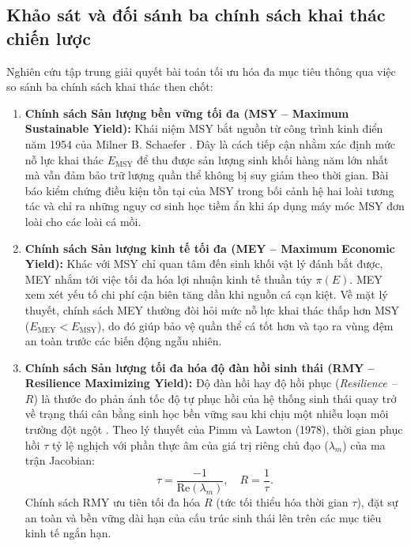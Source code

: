 \subsection{Khảo sát và đối sánh ba chính sách khai thác chiến lược}
Nghiên cứu tập trung giải quyết bài toán tối ưu hóa đa mục tiêu thông qua việc so sánh ba chính sách khai thác then chốt:
\begin{enumerate}
    \item \textbf{Chính sách Sản lượng bền vững tối đa (MSY -- Maximum Sustainable Yield):}
    Khái niệm MSY bắt nguồn từ công trình kinh điển năm 1954 của Milner B. Schaefer \cite{schaefer1954some}. Đây là cách tiếp cận nhằm xác định mức nỗ lực khai thác $E_{\mathrm{MSY}}$ để thu được sản lượng sinh khối hàng năm lớn nhất mà vẫn đảm bảo trữ lượng quần thể không bị suy giảm theo thời gian. Bài báo kiểm chứng điều kiện tồn tại của MSY trong bối cảnh hệ hai loài tương tác và chỉ ra những nguy cơ sinh học tiềm ẩn khi áp dụng máy móc MSY đơn loài cho các loài cá mồi.
    
    \item \textbf{Chính sách Sản lượng kinh tế tối đa (MEY -- Maximum Economic Yield):}
    Khác với MSY chỉ quan tâm đến sinh khối vật lý đánh bắt được, MEY nhắm tới việc tối đa hóa lợi nhuận kinh tế thuần túy $\pi(E)$. MEY xem xét yếu tố chi phí cận biên tăng dần khi nguồn cá cạn kiệt. Về mặt lý thuyết, chính sách MEY thường đòi hỏi mức nỗ lực khai thác thấp hơn MSY ($E_{\mathrm{MEY}} < E_{\mathrm{MSY}}$), do đó giúp bảo vệ quần thể cá tốt hơn và tạo ra vùng đệm an toàn trước các biến động ngẫu nhiên.
    
    \item \textbf{Chính sách Sản lượng tối đa hóa độ đàn hồi sinh thái (RMY -- Resilience Maximizing Yield):}
    Độ đàn hồi hay độ hồi phục (\textit{Resilience -- $R$}) là thước đo phản ánh tốc độ tự phục hồi của hệ thống sinh thái quay trở về trạng thái cân bằng sinh học bền vững sau khi chịu một nhiễu loạn môi trường đột ngột \cite{pimm1978feeding}. Theo lý thuyết của Pimm và Lawton (1978), thời gian phục hồi $\tau$ tỷ lệ nghịch với phần thực âm của giá trị riêng chủ đạo ($\lambda_m$) của ma trận Jacobian:
    \begin{equation}
    \tau = \frac{-1}{\mathrm{Re}(\lambda_m)}, \quad R = \frac{1}{\tau}.
    \end{equation}
    Chính sách RMY ưu tiên tối đa hóa $R$ (tức tối thiểu hóa thời gian $\tau$), đặt sự an toàn và bền vững dài hạn của cấu trúc sinh thái lên trên các mục tiêu kinh tế ngắn hạn.
\end{enumerate}

